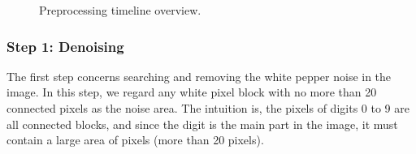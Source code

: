 \documentclass{article}
\begin{document}
\begin{figure}[!htb]
	\centering
\caption{Preprocessing timeline overview.}
\label{fig:preoverview}
\end{figure}

\subsubsection{Step 1: Denoising}
The first step concerns searching and removing the white pepper noise in the image. In this step, we regard any white pixel block with no more than 20 connected pixels as the noise area. The intuition is, the pixels of digits 0 to 9 are all connected blocks, and since the digit is the main part in the image, it must contain a large area of pixels (more than 20 pixels). 
\end{document}
